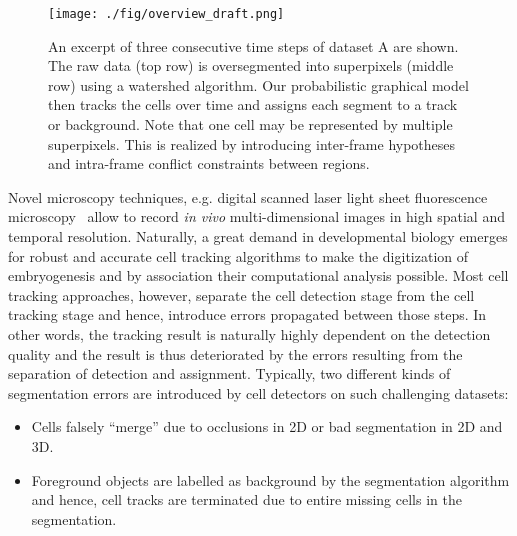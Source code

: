 \documentclass[10pt,twocolumn,letterpaper]{article}
\begin{document}
\begin{figure}[t]
\begin{center}
   \texttt{[image: ./fig/overview\_draft.png]}
\end{center}
   \caption{An excerpt of three consecutive time steps of dataset A are shown. The raw data (top row) 
is oversegmented into superpixels (middle row) using a watershed algorithm. Our probabilistic graphical model then 
tracks the cells over time and assigns each segment to a track or background. Note that one cell may be represented by
multiple superpixels. This is realized by introducing inter-frame hypotheses and intra-frame conflict constraints between regions.
}
\label{fig:overview}
\end{figure}


Novel microscopy techniques, e.g. digital scanned laser light sheet fluorescence 
microscopy~\cite{krzic_12_multiview,tomer_12_quantitative}
allow to record \emph{in vivo} multi-dimensional images in high spatial and temporal resolution. 
Naturally, a great demand in developmental biology emerges for robust and accurate cell tracking algorithms to make
the digitization of embryogenesis and by association their computational analysis possible.
Most cell tracking approaches, however, 
separate the cell detection stage from the cell tracking stage and hence, introduce errors propagated between those
steps. In other words,
the tracking result is naturally highly dependent on the detection quality and the result is thus deteriorated 
by the errors resulting from the separation of detection and assignment.
Typically, two different kinds of segmentation errors are introduced by cell detectors on such challenging datasets:
\begin{itemize}
      \item Cells falsely ``merge'' due to occlusions in 2D or bad segmentation in 2D and 3D.
      \item Foreground objects are labelled as background by the segmentation algorithm and hence, cell tracks
are terminated due to entire missing cells in the segmentation.
\end{itemize} 
\end{document}
